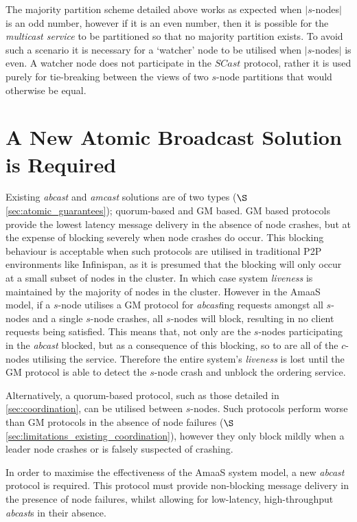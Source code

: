     The majority partition scheme detailed above works as expected when $|s$-nodes$|$ is an odd number, however if it is an even number, then it is possible for the \emph{multicast service} to be partitioned so that no majority partition exists.  To avoid such a scenario it is necessary for a \textquoteleft{}watcher' node to be utilised when $|s$-nodes$|$ is even.  A watcher node does not participate in the $SCast$ protocol, rather it is used purely for tie-breaking between the views of two $s$-node partitions that would otherwise be equal.  
    
\section{A New Atomic Broadcast Solution is Required}
Existing \emph{abcast} and \emph{amcast} solutions are of two types ($\S$ \ref{sec:atomic_guarantees}); quorum-based and GM based.  GM based protocols provide the lowest latency message delivery in the absence of node crashes, but at the expense of blocking severely when node crashes do occur.  This blocking behaviour is acceptable when such protocols are utilised in traditional P2P environments like Infinispan, as it is presumed that the blocking will only occur at a small subset of nodes in the cluster.  In which case system \emph{liveness} is maintained by the majority of nodes in the cluster.  However in the \textsf{AmaaS} model, if a $s$-node utilises a GM protocol for \emph{abcast}ing requests amongst all $s$-nodes and a single $s$-node crashes, all $s$-nodes will block, resulting in no client requests being satisfied. This means that, not only are the $s$-nodes participating in the \emph{abcast} blocked, but as a consequence of this blocking, so to are all of the $c$-nodes utilising the service.  Therefore the entire system's \emph{liveness} is lost until the GM protocol is able to detect the $s$-node crash and unblock the ordering service.  

Alternatively, a quorum-based protocol, such as those detailed in \ref{sec:coordination}, can be utilised between $s$-nodes.  Such protocols perform worse than GM protocols in the absence of node failures ($\S$ \ref{sec:limitations_existing_coordination}), however they only block mildly when a leader node crashes or is falsely suspected of crashing.  

In order to maximise the effectiveness of the \textsf{AmaaS} system model, a new \emph{abcast} protocol is required.  This protocol must provide non-blocking message delivery in the presence of node failures, whilst allowing for low-latency, high-throughput \emph{abcast}s in their absence.  

